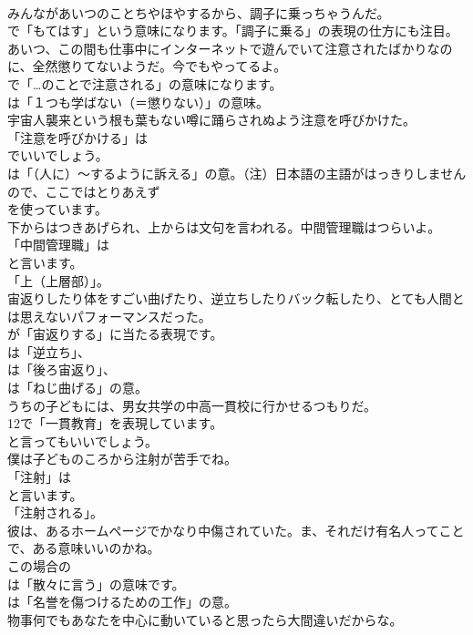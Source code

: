 \documentclass[8pt]{extreport}
\begin{document}
\begin{CJK}{UTF8}{min}
\\	みんながあいつのことちやほやするから、調子に乗っちゃうんだ。 
\\	で「もてはす」という意味になります。「調子に乗る」の表現の仕方にも注目。	
\\	あいつ、この間も仕事中にインターネットで遊んでいて注意されたばかりなのに、全然懲りてないようだ。今でもやってるよ。 
\\	で「…のことで注意される」の意味になります。
\\	は「１つも学ばない（＝懲りない）」の意味。	
\\	宇宙人襲来という根も葉もない噂に踊らされぬよう注意を呼びかけた。 
\\	「注意を呼びかける」は 
\\	でいいでしょう。
\\	は「（人に）～するように訴える」の意。（注）日本語の主語がはっきりしませんので、ここではとりあえず 
\\	を使っています。	
\\	下からはつきあげられ、上からは文句を言われる。中間管理職はつらいよ。 
\\	「中間管理職」は
\\	と言います。
\\	「上（上層部）」。	
\\	宙返りしたり体をすごい曲げたり、逆立ちしたりバック転したり、とても人間とは思えないパフォーマンスだった。 
\\	が「宙返りする」に当たる表現です。
\\	は「逆立ち」、
\\	は「後ろ宙返り」、
\\	は「ねじ曲げる」の意。	
\\	うちの子どもには、男女共学の中高一貫校に行かせるつもりだ。 
\\	12で「一貫教育」を表現しています。
\\	と言ってもいいでしょう。	
\\	僕は子どものころから注射が苦手でね。 
\\	「注射」は
\\	と言います。
\\	「注射される」。	
\\	彼は、あるホームページでかなり中傷されていた。ま、それだけ有名人ってことで、ある意味いいのかね。 
\\	この場合の 
\\	は「散々に言う」の意味です。
\\	は「名誉を傷つけるための工作」の意。	
\\	物事何でもあなたを中心に動いていると思ったら大間違いだからな。 

\end{CJK}
\end{document}
